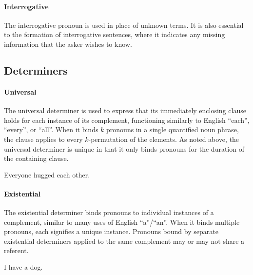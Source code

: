 \paragraph{Interrogative} The interrogative pronoun  is used in place
of unknown terms. It is also essential to the formation of interrogative
sentences, where it indicates any missing information that the asker wishes to
know.

\subsection{Determiners} \label{sec:determiners}

\paragraph{Universal} The universal determiner  is used to express that
its immediately enclosing clause holds for each instance of its complement,
functioning similarly to English ``each'', ``every'', or ``all''. When it binds
$k$ pronouns in a single quantified noun phrase, the clause applies to every
$k$-permutation of the elements. As noted above, the universal determiner is
unique in that it only binds pronouns for the duration of the containing clause.

{Everyone hugged each other.}
{}

\paragraph{Existential} The existential determiner  binds pronouns to
individual instances of a complement, similar to many uses of English
``a''/``an''. When it binds multiple pronouns, each signifies a unique instance.
Pronouns bound by separate existential determiners applied to the same
complement may or may not share a referent.

{I have a dog.}
{}




